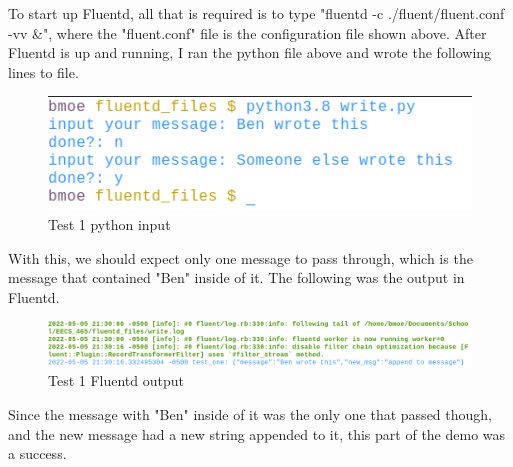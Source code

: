 To start up Fluentd, all that is required is to type "fluentd -c ./fluent/fluent.conf -vv \&", where the "fluent.conf" file is the configuration file shown above. After Fluentd is up and running, I ran the python file above and wrote the following lines
to file.
\begin{figure}[H]
    \centering
    \includegraphics[scale=0.8]{images/t1_3.png}
    \caption{Test 1 python input}
    \label{fig:pic5}
\end{figure}
With this, we should expect only one message to pass through, which is the message that contained "Ben" inside of it. The following was the output in Fluentd.
\begin{figure}[H]
    \centering
    \includegraphics[scale=0.55]{images/t1_4.png}
    \caption{Test 1 Fluentd output}
    \label{fig:pic6}
\end{figure}
Since the message with "Ben" inside of it was the only one that passed though, and the new message had a new string appended to it, this part of the demo was a success.
